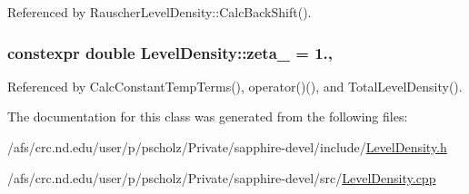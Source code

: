 Referenced by Rauscher\-Level\-Density\-::\-Calc\-Back\-Shift().

\hypertarget{classLevelDensity_a853b9aa1ea19b486c4576c6d5d482caf}{
\subsubsection[{zeta\-\_\-}]{\setlength{\rightskip}{0pt plus 5cm}constexpr double Level\-Density\-::zeta\-\_\- = 1.\hspace{0.3cm}{\ttfamily [static]}, {\ttfamily [protected]}}}\label{classLevelDensity_a853b9aa1ea19b486c4576c6d5d482caf}


Referenced by Calc\-Constant\-Temp\-Terms(), operator()(), and Total\-Level\-Density().



The documentation for this class was generated from the following files\-:\begin{DoxyCompactItemize}
\item 
/afs/crc.\-nd.\-edu/user/p/pscholz/\-Private/sapphire-\/devel/include/\hyperlink{LevelDensity_8h}{Level\-Density.\-h}\item 
/afs/crc.\-nd.\-edu/user/p/pscholz/\-Private/sapphire-\/devel/src/\hyperlink{LevelDensity_8cpp}{Level\-Density.\-cpp}\end{DoxyCompactItemize}
